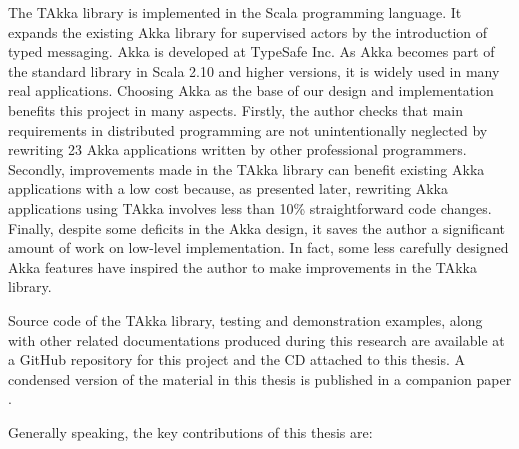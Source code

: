 The TAkka library is implemented in the Scala programming language.  It
expands the existing Akka library for supervised actors by the introduction 
of typed messaging.  Akka is developed at TypeSafe Inc.  
As Akka becomes part of the standard library in Scala 2.10 
and higher versions, it is widely used in many real applications.  Choosing 
Akka as the base of our design and implementation benefits this project in 
many aspects.  Firstly, the author checks that main requirements in distributed 
programming are not unintentionally neglected by rewriting 23 Akka applications 
written by other professional programmers.  Secondly, improvements made in 
the TAkka library can benefit existing Akka applications with a low cost because, 
as presented later, rewriting Akka applications using TAkka involves less than 10\% 
straightforward code changes.  Finally, despite some deficits in the Akka design, 
it saves the author a significant amount of work on low-level implementation.  
In fact, some less carefully designed Akka features have inspired the author to 
make improvements in the TAkka library.

Source code of the TAkka library, testing and demonstration examples, along with
other related documentations produced during this research are available at a 
GitHub repository for this project \citep{takka_repo} and the CD attached to this thesis.
A condensed version of the material in this thesis is published in a companion paper \citep{TAKKA_paper}.

Generally speaking, the key contributions of this thesis are:

